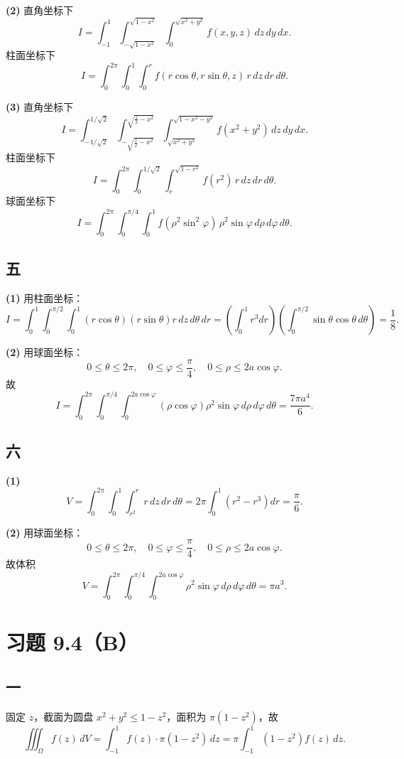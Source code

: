 \documentclass[12pt,a4paper]{ctexart}
\begin{document}
\textbf{(2)} 直角坐标下
\[
I=\int_{-1}^1\int_{-\sqrt{1-x^2}}^{\sqrt{1-x^2}}\int_0^{\sqrt{x^2+y^2}} f(x,y,z)\,dz\,dy\,dx.
\]
柱面坐标下
\[
I=\int_0^{2\pi}\int_0^1\int_0^{r} f(r\cos\theta,r\sin\theta,z)\,r\,dz\,dr\,d\theta.
\]

\textbf{(3)} 直角坐标下
\[
I=\int_{-1/\sqrt2}^{1/\sqrt2}\int_{-\sqrt{\frac12-x^2}}^{\sqrt{\frac12-x^2}}\int_{\sqrt{x^2+y^2}}^{\sqrt{1-x^2-y^2}} f(x^2+y^2)\,dz\,dy\,dx.
\]
柱面坐标下
\[
I=\int_0^{2\pi}\int_0^{1/\sqrt2}\int_{r}^{\sqrt{1-r^2}} f(r^2)\,r\,dz\,dr\,d\theta.
\]
球面坐标下
\[
I=\int_0^{2\pi}\int_0^{\pi/4}\int_0^1 f(\rho^2\sin^2\varphi)\,\rho^2\sin\varphi\,d\rho\,d\varphi\,d\theta.
\]

\subsection*{五}
\textbf{(1)} 用柱面坐标：
\[
I=\int_0^1\int_0^{\pi/2}\int_0^1 (r\cos\theta)(r\sin\theta)r\,dz\,d\theta\,dr
=\left(\int_0^1r^3dr\right)\left(\int_0^{\pi/2}\sin\theta\cos\theta\,d\theta\right)
=\frac18.
\]

\textbf{(2)} 用球面坐标：
\[
0\le \theta\le 2\pi,\quad 0\le \varphi\le \frac{\pi}{4},\quad 0\le \rho\le 2a\cos\varphi.
\]
故
\[
I=\int_0^{2\pi}\int_0^{\pi/4}\int_0^{2a\cos\varphi}(\rho\cos\varphi)\rho^2\sin\varphi\,d\rho\,d\varphi\,d\theta
=\frac{7\pi a^4}{6}.
\]

\subsection*{六}
\textbf{(1)}
\[
V=\int_0^{2\pi}\int_0^1\int_{r^2}^{r} r\,dz\,dr\,d\theta
=2\pi\int_0^1(r^2-r^3)dr=\frac{\pi}{6}.
\]

\textbf{(2)} 用球面坐标：
\[
0\le \theta\le 2\pi,\quad 0\le \varphi\le \frac{\pi}{4},\quad 0\le \rho\le 2a\cos\varphi.
\]
故体积
\[
V=\int_0^{2\pi}\int_0^{\pi/4}\int_0^{2a\cos\varphi}\rho^2\sin\varphi\,d\rho\,d\varphi\,d\theta
=\pi a^3.
\]

\section*{习题 9.4（B）}

\subsection*{一}
固定 $z$，截面为圆盘 $x^2+y^2\le 1-z^2$，面积为 $\pi(1-z^2)$，故
\[
\iiint_{\Omega}f(z)\,dV=\int_{-1}^1 f(z)\cdot \pi(1-z^2)\,dz
=\pi\int_{-1}^1(1-z^2)f(z)\,dz.
\]
\end{document}

